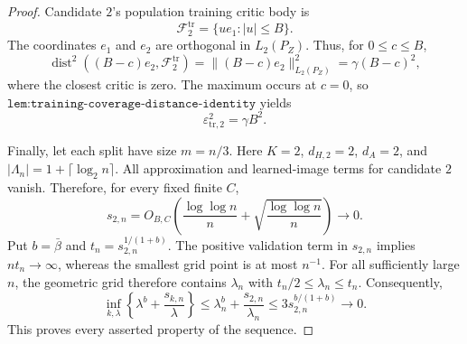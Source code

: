 \begin{proof}
Candidate \(2\)'s population training critic body is
\[
 \mathcal F_2^{\mathrm{tr}}=\{u e_1:|u|\le B\}.
\]
The coordinates \(e_1\) and \(e_2\) are orthogonal in \(L_2(P_Z)\). Thus, for \(0\le c\le B\),
\[
 \operatorname{dist}^2((B-c)e_2,\mathcal F_2^{\mathrm{tr}})
 =\|(B-c)e_2\|_{L_2(P_Z)}^2
 =\gamma(B-c)^2,
\]
where the closest critic is zero. The maximum occurs at \(c=0\), so \(\texttt{lem:training-coverage-distance-identity}\) yields
\[
 \varepsilon_{\mathrm{tr},2}^2=\gamma B^2.
\]

Finally, let each split have size \(m=n/3\). Here \(K=2\), \(d_{H,2}=2\), \(d_A=2\), and \(|\Lambda_n|=1+\lceil\log_2n\rceil\). All approximation and learned-image terms for candidate \(2\) vanish. Therefore, for every fixed finite \(C\),
\[
 s_{2,n}
 =O_{B,C}\!\left(
 \frac{\log\log n}{n}
 +\sqrt{\frac{\log\log n}{n}}
 \right)
 \longrightarrow0.
\]
Put \(b=\bar\beta\) and \(t_n=s_{2,n}^{1/(1+b)}\). The positive validation term in \(s_{2,n}\) implies \(nt_n\to\infty\), whereas the smallest grid point is at most \(n^{-1}\). For all sufficiently large \(n\), the geometric grid therefore contains \(\lambda_n\) with \(t_n/2\le\lambda_n\le t_n\). Consequently,
\[
 \inf_{k,\lambda}
 \left\{\lambda^b+\frac{s_{k,n}}{\lambda}\right\}
 \le \lambda_n^b+\frac{s_{2,n}}{\lambda_n}
 \le3s_{2,n}^{b/(1+b)}
 \longrightarrow0.
\]
This proves every asserted property of the sequence.
\end{proof}